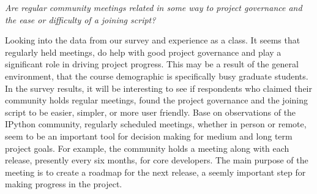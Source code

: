 {\it Are regular community meetings related in some way to project governance and the ease or difficulty of a joining script?}

Looking into the data from our survey and experience as a class. It seems that regularly held meetings, do help with good project governance and play a significant role in driving project progress. This may be a result of the general environment, that the course demographic is specifically busy graduate students. In the survey results, it will be interesting to see if respondents who claimed their community holds regular meetings, found the project governance and the joining script to be easier, simpler, or more user friendly. Base on observations of the IPython community, regularly scheduled meetings, whether in person or remote, seem to be an important tool for decision making for medium and long term project goals. For example, the community holds a meeting along with each release, presently every six months, for core developers. The main purpose of the meeting is to create a roadmap for the next release, a seemly important step for making progress in the project.
